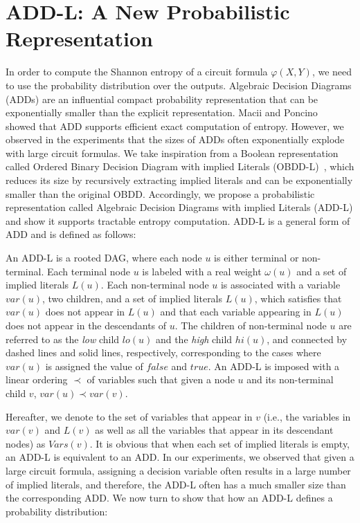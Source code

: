 \section{ADD-L: A New Probabilistic Representation}
\label{sec:ADDL}

In order to compute the Shannon entropy of a circuit formula $\varphi(X, Y)$, we need to use the probability distribution over the outputs.
Algebraic Decision Diagrams (ADDs) are an influential compact probability representation that can be exponentially smaller than the explicit representation.
Macii and Poncino~\cite{macii1996exact} showed that ADD supports efficient exact computation of entropy.
However, we observed in the experiments that the sizes of ADDs often exponentially explode with large circuit formulas.
We take inspiration from a Boolean representation called Ordered Binary Decision Diagram with implied Literals (OBDD-L)~\cite{lai2013reduced}, which reduces its size by recursively extracting implied literals and can be exponentially smaller than the original OBDD.
Accordingly, we propose a probabilistic representation called Algebraic Decision Diagrams with implied Literals (ADD-L) and show it supports tractable entropy computation.
ADD-L is a general form of ADD and is defined as follows:

\begin{definition}\label{ADDL-definition}
An ADD-L is a rooted DAG, where each node $u$ is either terminal or non-terminal.
Each terminal node $u$ is labeled with a real weight $\omega(u)$ and a set of implied literals $L(u)$.
Each non-terminal node $u$ is associated with a variable $\mathit{var}(u)$, two children, and a set of implied literals $L(u)$, which satisfies that $\mathit{var}(u)$ does not appear in $L(u)$ and that each variable appearing in $L(u)$ does not appear in the descendants of $u$.
The children of non-terminal node $u$ are referred to as the \textit{low} child $lo(u)$ and the \textit{high} child $hi(u)$, and connected by dashed lines and solid lines, respectively, corresponding to the cases where $\mathit{var}(u)$ is assigned the value of $\mathit{false}$ and  $\mathit{true}$. 
An ADD-L is imposed with a linear ordering $\prec$ of variables such that given a node $u$ and its non-terminal child $v$, $\mathit{var}(u) \prec \mathit{var}(v) $.
\end{definition}

Hereafter, we denote to the set of variables that appear in $v$ (i.e., the variables in $\mathit{var}(v)$ and $L(v)$ as well as all the variables that appear in its descendant nodes) as $\mathit{Vars}(v)$.
It is obvious that when each set of implied literals is empty, an ADD-L is equivalent to an ADD.
In our experiments, we observed that given a large circuit formula, assigning a decision variable often results in a large number of implied literals, and therefore, the ADD-L often has a much smaller size than the corresponding ADD.
We now turn to show that how an ADD-L defines a probability distribution:
 
